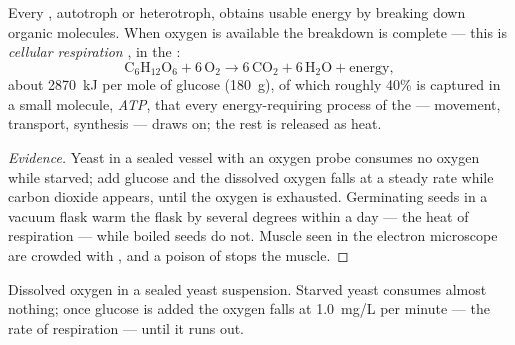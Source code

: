 \begin{proposition}\label{prop:g10:cell-metabolism:respiration}
Every , autotroph or heterotroph, obtains usable energy by breaking
down organic molecules. When oxygen is available the breakdown is
complete --- this is \emph{cellular respiration}
, in the :
\[
\mathrm{C_6H_{12}O_6} + 6\,\mathrm{O_2} \longrightarrow
6\,\mathrm{CO_2} + 6\,\mathrm{H_2O} + \text{energy},
\]
about \qty{2870}{kJ} per mole of glucose (\qty{180}{g}), of which
roughly 40\% is captured in a small molecule,
\emph{ATP}, that every energy-requiring process of the
 --- movement, transport, synthesis --- draws on; the rest is
released as heat.
\end{proposition}
\begin{proof}[Evidence]
Yeast in a sealed vessel with an oxygen probe consumes no oxygen while
starved; add glucose and the dissolved oxygen falls at a steady rate
while carbon dioxide appears, until the oxygen is exhausted. Germinating
seeds in a vacuum flask warm the flask by several degrees within a day
--- the heat of respiration --- while boiled seeds do not. Muscle 
seen in the electron microscope are crowded with , and a
poison of  stops the muscle.
\end{proof}

\begin{omfigure}

{\small Dissolved oxygen in a sealed yeast suspension. Starved yeast
consumes almost nothing; once glucose is added the oxygen falls at
\qty{1.0}{mg/L} per minute --- the rate of respiration --- until it
runs out.}
\end{omfigure}

